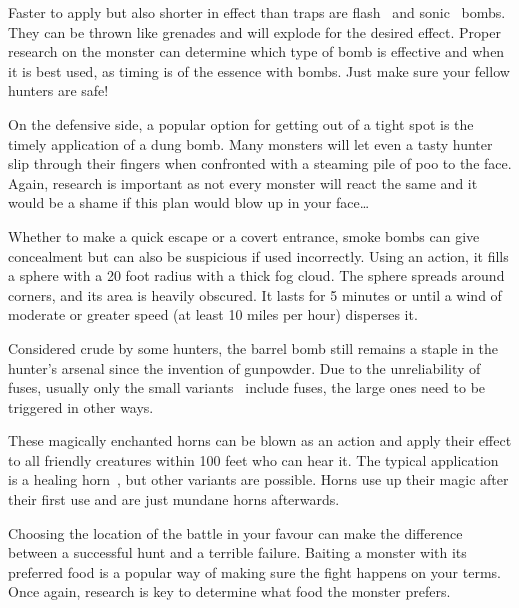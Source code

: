  Faster to apply but also shorter in effect than traps are flash~ and sonic~ bombs. They can be thrown like grenades and will explode for the desired effect. Proper research on the monster can determine which type of bomb is effective and when it is best used, as timing is of the essence with bombs. Just make sure your fellow hunters are safe!

On the defensive side, a popular option for getting out of a tight spot is the timely application of a dung bomb. Many monsters will let even a tasty hunter slip through their fingers when confronted with a steaming pile of poo to the face. Again, research is important as not every monster will react the same and it would be a shame if this plan would blow up in your face\ldots

Whether to make a quick escape or a covert entrance, smoke bombs can give concealment but can also be suspicious if used incorrectly. Using an action, it fills a sphere with a 20 foot radius with a thick fog cloud. The sphere spreads around corners, and its area is heavily obscured. It lasts for 5 minutes or until a wind of moderate or greater speed (at least 10 miles per hour) disperses it.

Considered crude by some hunters, the barrel bomb still remains a staple in the hunter's arsenal since the invention of gunpowder. Due to the unreliability of fuses, usually only the small variants~ include fuses, the large ones need to be triggered in other ways.

These magically enchanted horns can be blown as an action and apply their effect to all friendly creatures within 100 feet who can hear it. The typical application is a healing horn~, but other variants are possible. Horns use up their magic after their first use and are just mundane horns afterwards.

Choosing the location of the battle in your favour can make the difference between a successful hunt and a terrible failure. Baiting a monster with its preferred food is a popular way of making sure the fight happens on your terms. Once again, research is key to determine what food the monster prefers.

